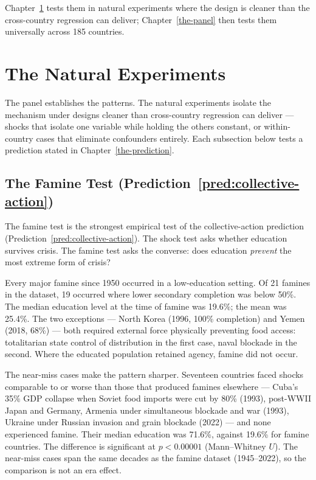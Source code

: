 \documentclass[12pt,letterpaper]{article}
\begin{document}
Chapter~\ref{natural-experiments} tests them in natural experiments where the design is cleaner than the cross-country regression can deliver; Chapter~\ref{the-panel} then tests them universally across 185 countries.


\section{The Natural Experiments}\label{natural-experiments}

The panel establishes the patterns. The natural experiments isolate
the mechanism under designs cleaner than cross-country regression can
deliver --- shocks that isolate one variable while holding the others
constant, or within-country cases that eliminate confounders
entirely. Each subsection below tests a prediction stated in
Chapter~\ref{the-prediction}.

\subsection{The Famine Test (Prediction~\ref{pred:collective-action})}\label{the-famine-test}

The famine test is the strongest empirical test of the collective-action prediction (Prediction~\ref{pred:collective-action}). The shock test asks whether education survives crisis. The famine test asks the converse: does education \emph{prevent} the most extreme form of crisis?

Every major famine since 1950 occurred in a low-education setting. Of 21 famines in the dataset, 19 occurred where lower secondary completion was below 50\%. The median education level at the time of famine was 19.6\%; the mean was 25.4\%. The two exceptions --- North Korea (1996, 100\% completion) and Yemen (2018, 68\%) --- both required external force physically preventing food access: totalitarian state control of distribution in the first case, naval blockade in the second. Where the educated population retained agency, famine did not occur.

The near-miss cases make the pattern sharper. Seventeen countries faced shocks comparable to or worse than those that produced famines elsewhere --- Cuba's 35\% GDP collapse when Soviet food imports were cut by 80\% (1993), post-WWII Japan and Germany, Armenia under simultaneous blockade and war (1993), Ukraine under Russian invasion and grain blockade (2022) --- and none experienced famine. Their median education was 71.6\%, against 19.6\% for famine countries. The difference is significant at $p < 0.00001$ (Mann--Whitney $U$). The near-miss cases span the same decades as the famine dataset (1945--2022), so the comparison is not an era effect.
\end{document}
